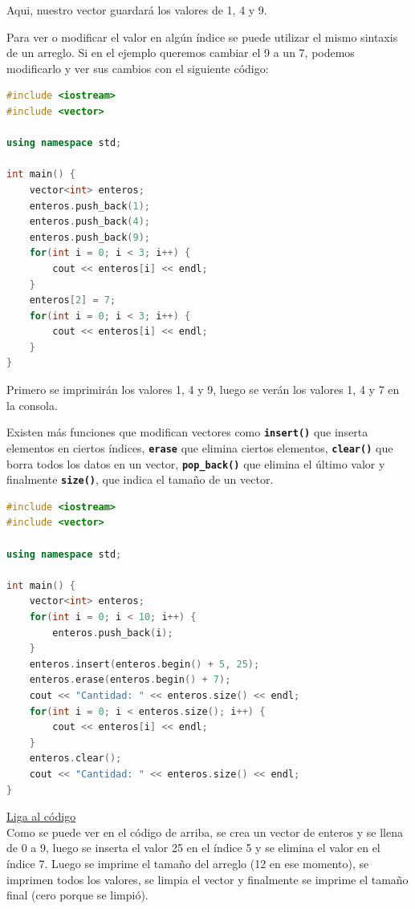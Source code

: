 \documentclass{article}
\begin{document}
Aqui, nuestro vector guardará los valores de 1, 4 y 9.

Para ver o modificar el valor en algún índice se puede utilizar el mismo sintaxis de un arreglo. Si en el ejemplo queremos cambiar el 9 a un 7, podemos modificarlo y ver sus cambios con el siguiente código:

\begin{lstlisting}[language=C++, title=Modificando valores]
#include <iostream>
#include <vector>

using namespace std;

int main() {
	vector<int> enteros;
	enteros.push_back(1);
	enteros.push_back(4);
	enteros.push_back(9);
	for(int i = 0; i < 3; i++) {
		cout << enteros[i] << endl;
	}
	enteros[2] = 7;
	for(int i = 0; i < 3; i++) {
		cout << enteros[i] << endl;
	}
}
\end{lstlisting}

Primero se imprimirán los valores 1, 4 y 9, luego se verán los valores 1, 4 y 7 en la consola.

Existen más funciones que modifican vectores como \textbf{\lstinline{insert()}} que inserta elementos en ciertos índices, \textbf{\lstinline{erase}} que elimina ciertos elementos, \textbf{\lstinline{clear()}} que borra todos los datos en un vector, \textbf{\lstinline{pop_back()}} que elimina el último valor y finalmente \textbf{\lstinline{size()}}, que indica el tamaño de un vector.

\begin{lstlisting}[language=C++, title=Jugando con vectores]
#include <iostream>
#include <vector>

using namespace std;

int main() {
	vector<int> enteros;
	for(int i = 0; i < 10; i++) {
		enteros.push_back(i);
	}
	enteros.insert(enteros.begin() + 5, 25);
	enteros.erase(enteros.begin() + 7);
	cout << "Cantidad: " << enteros.size() << endl;
	for(int i = 0; i < enteros.size(); i++) {
		cout << enteros[i] << endl;
	}
	enteros.clear();
	cout << "Cantidad: " << enteros.size() << endl;
}
\end{lstlisting}
\href{https://repl.it/@Jamesscn/Juego-de-Vectores}{Liga al código}\\

Como se puede ver en el código de arriba, se crea un vector de enteros y se llena de 0 a 9, luego se inserta el valor 25 en el índice 5 y se elimina el valor en el índice 7. Luego se imprime el tamaño del arreglo (12 en ese momento), se imprimen todos los valores, se limpia el vector y finalmente se imprime el tamaño final (cero porque se limpió).
\end{document}
